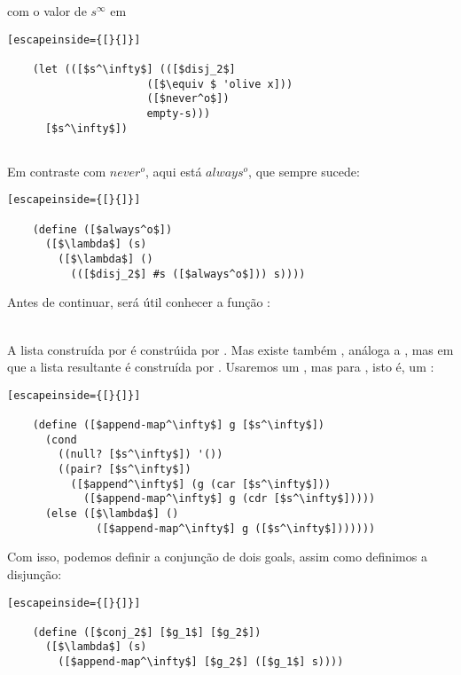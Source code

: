   \noindent com o valor de $s^\infty$ em

  \begin{lstlisting}[escapeinside={[}{]}]

    (let (([$s^\infty$] (([$disj_2$]
                      ([$\equiv $ 'olive x]))
                      ([$never^o$])
                      empty-s)))
      [$s^\infty$])
                      
  \end{lstlisting}

  Em contraste com $never^o$, aqui está $always^o$, que sempre sucede:

  \begin{lstlisting}[escapeinside={[}{]}]

    (define ([$always^o$])
      ([$\lambda$] (s)
        ([$\lambda$] ()
          (([$disj_2$] #s ([$always^o$])) s))))

  \end{lstlisting}

  Antes de continuar, será útil conhecer a função :\\
   \seta\ 

  \noindent A lista construída por  é constrúida por
  . Mas existe também , análoga
  a , mas em que a lista resultante é construída por
  . Usaremos um , mas para
  , isto é, um :

  \begin{lstlisting}[escapeinside={[}{]}]

    (define ([$append-map^\infty$] g [$s^\infty$])
      (cond
        ((null? [$s^\infty$]) '())
        ((pair? [$s^\infty$])
          ([$append^\infty$] (g (car [$s^\infty$]))
            ([$append-map^\infty$] g (cdr [$s^\infty$]))))
      (else ([$\lambda$] ()
              ([$append-map^\infty$] g ([$s^\infty$]))))))

  \end{lstlisting}

  Com isso, podemos definir a conjunção de dois goals, assim como
  definimos a disjunção:

  \begin{lstlisting}[escapeinside={[}{]}]

    (define ([$conj_2$] [$g_1$] [$g_2$])
      ([$\lambda$] (s)
        ([$append-map^\infty$] [$g_2$] ([$g_1$] s))))

  \end{lstlisting}


